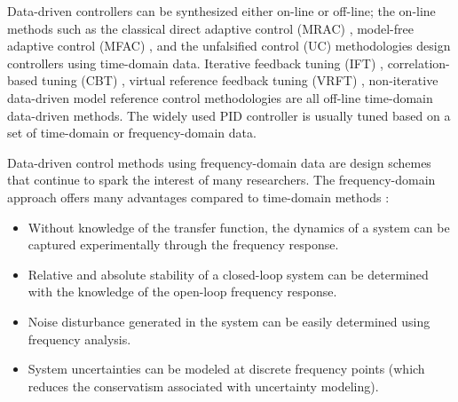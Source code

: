 \documentclass[journal]{IEEEtran}
\begin{document}
Data-driven controllers can be synthesized either on-line or off-line; the on-line methods such as the classical direct adaptive control (MRAC) \cite{LLMK11}, model-free adaptive control (MFAC) \cite{HJ13}, and the unfalsified control (UC) \cite{ST97} methodologies design controllers using time-domain data. Iterative feedback tuning (IFT) \cite{Hja02}, correlation-based tuning (CBT) \cite{KMB02a}, virtual reference feedback tuning (VRFT) \cite{CLS02}, non-iterative data-driven model reference control \cite{KVB07} methodologies are all off-line time-domain data-driven methods.  The widely used PID controller is usually tuned based on a set of time-domain or frequency-domain data. 

Data-driven control methods using frequency-domain data are design schemes that continue to spark the interest of many researchers. The frequency-domain approach offers many advantages compared to time-domain methods :
\begin{itemize}
\item Without knowledge of the transfer function, the dynamics of a system can be captured experimentally through the frequency response.
\item Relative and absolute stability of a closed-loop system can be determined with the knowledge of the open-loop frequency response.
\item Noise disturbance generated in the system can be easily determined using frequency analysis.
\item System uncertainties can be modeled at discrete frequency points (which reduces the conservatism associated with uncertainty modeling). 
\end{itemize}
\end{document}

